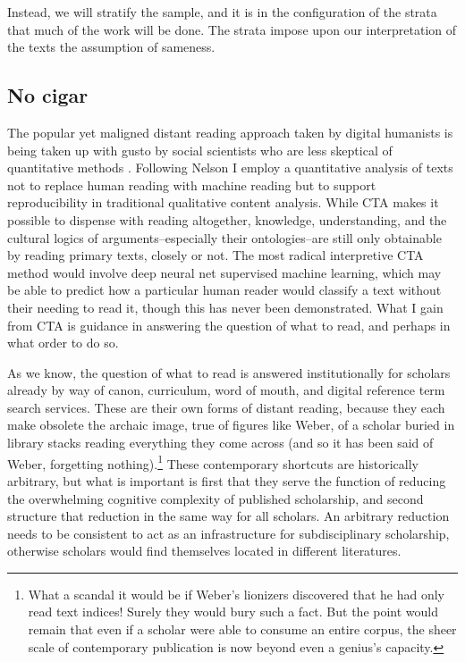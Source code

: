 \documentclass[]{book}
\let\rmarkdownfootnote\footnote%
\def\footnote{\protect\rmarkdownfootnote}
\theoremstyle{definition}
\theoremstyle{definition}
\theoremstyle{definition}
\theoremstyle{remark}
\begin{document}
Instead, we will stratify the sample, and it is in the configuration of
the strata that much of the work will be done. The strata impose upon
our interpretation of the texts the assumption of sameness.

\hypertarget{no-cigar}{%
\subsection{No cigar}\label{no-cigar}}

The popular yet maligned distant reading approach taken by digital
humanists \citep[e.g.~][]{Moretti2005Graphs} is being taken up with
gusto by social scientists who are less skeptical of quantitative
methods \citep[e.g.~][]{DiMaggio2013Exploiting}. Following Nelson
\citeyearpar{Nelson2017Computational} I employ a quantitative analysis
of texts not to replace human reading with machine reading but to
support reproducibility in traditional qualitative content analysis.
While CTA makes it possible to dispense with reading altogether,
knowledge, understanding, and the cultural logics of
arguments--especially their ontologies--are still only obtainable by
reading primary texts, closely or not. The most radical interpretive CTA
method would involve deep neural net supervised machine learning, which
may be able to predict how a particular human reader would classify a
text without their needing to read it, though this has never been
demonstrated. What I gain from CTA is guidance in answering the question
of what to read, and perhaps in what order to do so.

As we know, the question of what to read is answered institutionally for
scholars already by way of canon, curriculum, word of mouth, and digital
reference term search services. These are their own forms of distant
reading, because they each make obsolete the archaic image, true of
figures like Weber, of a scholar buried in library stacks reading
everything they come across (and so it has been said of Weber,
forgetting nothing).\footnote{What a scandal it would be if Weber's
  lionizers discovered that he had only read text indices! Surely they
  would bury such a fact. But the point would remain that even if a
  scholar were able to consume an entire corpus, the sheer scale of
  contemporary publication is now beyond even a genius's capacity.}
These contemporary shortcuts are historically arbitrary, but what is
important is first that they serve the function of reducing the
overwhelming cognitive complexity of published scholarship, and second
structure that reduction in the same way for all scholars. An arbitrary
reduction needs to be consistent to act as an infrastructure for
subdisciplinary scholarship, otherwise scholars would find themselves
located in different literatures.
\end{document}
